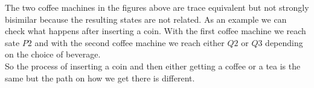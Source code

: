 \documentclass{report}
\begin{document}
  The two coffee machines in the figures above are trace equivalent but not strongly bisimilar because the resulting states are not related. As an example we can check what happens after inserting a coin. With the first coffee machine we reach sate $P2$ and with the second coffee machine we reach either $Q2$ or $Q3$ depending on the choice of beverage.\\
  So the process of inserting a coin and then either getting a coffee or a tea is the same but the path on how we get there is different.

  
\end{document}
